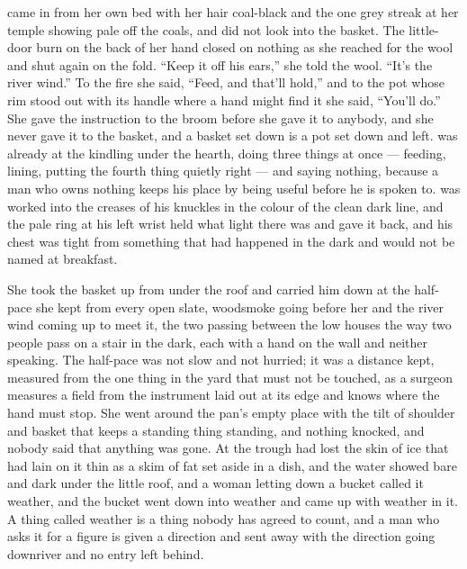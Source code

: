  came in from her own bed with her hair coal-black and the one grey streak at her temple showing pale off the coals, and did not look into the basket. The little-door burn on the back of her hand closed on nothing as she reached for the wool and shut again on the fold. “Keep it off his ears,” she told the wool. “It's the river wind.” To the fire she said, “Feed, and that'll hold,” and to the pot whose rim stood out with its handle where a hand might find it she said, “You'll do.” She gave the instruction to the broom before she gave it to anybody, and she never gave it to the basket, and a basket set down is a pot set down and left.  was already at the kindling under the hearth, doing three things at once --- feeding, lining, putting the fourth thing quietly right --- and saying nothing, because a man who owns nothing keeps his place by being useful before he is spoken to.  was worked into the creases of his knuckles in the colour of the clean dark line, and the pale ring at his left wrist held what light there was and gave it back, and his chest was tight from something that had happened in the dark and would not be named at breakfast.

\scenebreak

She took the basket up from under the roof and carried him down at the half-pace she kept from every open slate, woodsmoke going before her and the river wind coming up to meet it, the two passing between the low houses the way two people pass on a stair in the dark, each with a hand on the wall and neither speaking. The half-pace was not slow and not hurried; it was a distance kept, measured from the one thing in the yard that must not be touched, as a surgeon measures a field from the instrument laid out at its edge and knows where the hand must stop. She went around the pan's empty place with the tilt of shoulder and basket that keeps a standing thing standing, and nothing knocked, and nobody said that anything was gone. At  the trough had lost the skin of ice that had lain on it thin as a skim of fat set aside in a dish, and the water showed bare and dark under the little roof, and a woman letting down a bucket called it weather, and the bucket went down into weather and came up with weather in it. A thing called weather is a thing nobody has agreed to count, and a man who asks it for a figure is given a direction and sent away with the direction going downriver and no entry left behind.

